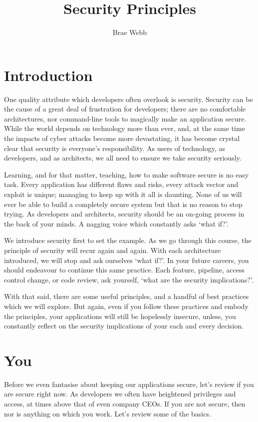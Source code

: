 \title{Security Principles}
\author{Brae Webb}
\date{}

\maketitle

\section{Introduction}

One quality attribute which developers often overlook is security.
Security can be the cause of a great deal of frustration for developers;
there are no comfortable architectures, nor command-line tools to magically make an application secure.
While the world depends on technology more than ever, and, at the same time the impacts of cyber attacks become more devastating,
it has become crystal clear that security is everyone's responsibility.
As users of technology, as developers, and as architects, we all need to ensure we take security seriously.

Learning, and for that matter, teaching, how to make software secure is no easy task.
Every application has different flaws and risks, every attack vector and exploit is unique; managing to keep up with it all is daunting.
None of us will ever be able to build a completely secure system but that is no reason to stop trying.
As developers and architects, security should be an on-going process in the back of your minds.
A nagging voice which constantly asks `what if?'.

We introduce security first to set the example.
As we go through this course, the principle of security will recur again and again.
With each architecture introduced, we will stop and ask ourselves `what if?'.
In your future careers, you should endeavour to continue this same practice.
Each feature, pipeline, access control change, or code review, ask yourself, `what are the security implications?'.

With that said, there are some useful principles, and a handful of best practices which we will explore.
But again, even if you follow these practices and embody the principles,
your applications will still be hopelessly insecure, unless,
you constantly reflect on the security implications of your each and every decision.

\section{You}
Before we even fantasise about keeping our applications secure, let's review if you are secure right now.
As developers we often have heightened privileges and access, at times above that of even company CEOs.
If you are not secure, then nor is anything on which you work.
Let's review some of the basics.

